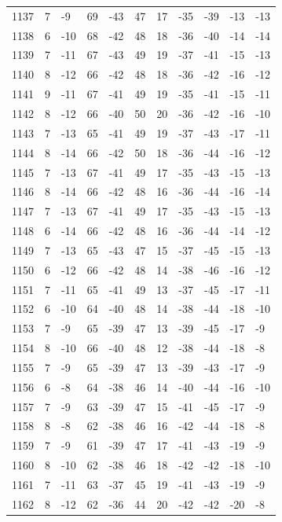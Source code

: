 \begin{table}[H]
\begin{tabular}{lllllllllll}
1137 & 7 & -9 & 69 & -43 & 47 & 17 & -35 & -39 & -13 & -13 \\
1138 & 6 & -10 & 68 & -42 & 48 & 18 & -36 & -40 & -14 & -14 \\
1139 & 7 & -11 & 67 & -43 & 49 & 19 & -37 & -41 & -15 & -13 \\
1140 & 8 & -12 & 66 & -42 & 48 & 18 & -36 & -42 & -16 & -12 \\
1141 & 9 & -11 & 67 & -41 & 49 & 19 & -35 & -41 & -15 & -11 \\
1142 & 8 & -12 & 66 & -40 & 50 & 20 & -36 & -42 & -16 & -10 \\
1143 & 7 & -13 & 65 & -41 & 49 & 19 & -37 & -43 & -17 & -11 \\
1144 & 8 & -14 & 66 & -42 & 50 & 18 & -36 & -44 & -16 & -12 \\
1145 & 7 & -13 & 67 & -41 & 49 & 17 & -35 & -43 & -15 & -13 \\
1146 & 8 & -14 & 66 & -42 & 48 & 16 & -36 & -44 & -16 & -14 \\
1147 & 7 & -13 & 67 & -41 & 49 & 17 & -35 & -43 & -15 & -13 \\
1148 & 6 & -14 & 66 & -42 & 48 & 16 & -36 & -44 & -14 & -12 \\
1149 & 7 & -13 & 65 & -43 & 47 & 15 & -37 & -45 & -15 & -13 \\
1150 & 6 & -12 & 66 & -42 & 48 & 14 & -38 & -46 & -16 & -12 \\
1151 & 7 & -11 & 65 & -41 & 49 & 13 & -37 & -45 & -17 & -11 \\
1152 & 6 & -10 & 64 & -40 & 48 & 14 & -38 & -44 & -18 & -10 \\
1153 & 7 & -9 & 65 & -39 & 47 & 13 & -39 & -45 & -17 & -9 \\
1154 & 8 & -10 & 66 & -40 & 48 & 12 & -38 & -44 & -18 & -8 \\
1155 & 7 & -9 & 65 & -39 & 47 & 13 & -39 & -43 & -17 & -9 \\
1156 & 6 & -8 & 64 & -38 & 46 & 14 & -40 & -44 & -16 & -10 \\
1157 & 7 & -9 & 63 & -39 & 47 & 15 & -41 & -45 & -17 & -9 \\
1158 & 8 & -8 & 62 & -38 & 46 & 16 & -42 & -44 & -18 & -8 \\
1159 & 7 & -9 & 61 & -39 & 47 & 17 & -41 & -43 & -19 & -9 \\
1160 & 8 & -10 & 62 & -38 & 46 & 18 & -42 & -42 & -18 & -10 \\
1161 & 7 & -11 & 63 & -37 & 45 & 19 & -41 & -43 & -19 & -9 \\
1162 & 8 & -12 & 62 & -36 & 44 & 20 & -42 & -42 & -20 & -8 \\

\end{tabular}
\end{table}
